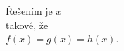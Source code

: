 \documentclass[preview]{standalone}
\begin{document}
\begin{center}
Řešením je $x$\\ takové, že\\ $f(x)=g(x)=h(x)$.
\end{center}
\end{document}
